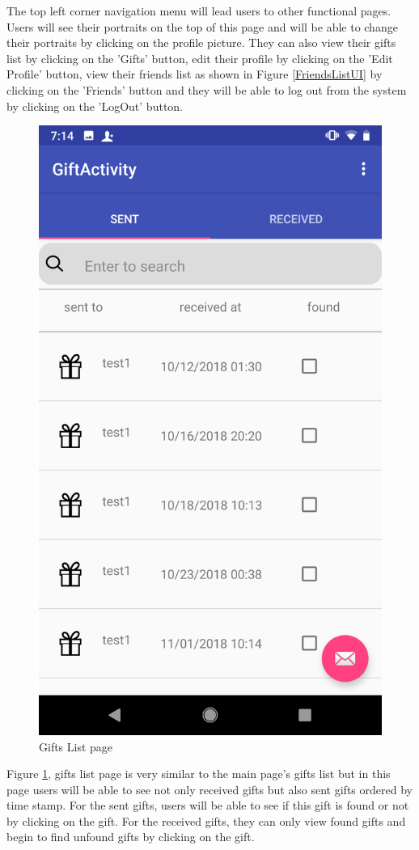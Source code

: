 \par The top left corner navigation menu will lead users to other functional pages. Users will see their portraits on the top of this page and will be able to change their portraits by clicking on the profile picture. They can also view their gifts list by clicking on the 'Gifts' button, edit their profile by clicking on the 'Edit Profile' button, view their friends list as shown in Figure \ref{FriendsListUI} by clicking on the 'Friends' button and they will be able to log out from the system by clicking on the 'LogOut' button. 

\begin{figure}[htb]
\centering
\includegraphics[width=.5\textwidth]{section03/assets/GiftsList.png}
\caption[Short Caption 2]{\label{GiftsListUI}Gifts List page}
\end{figure}
\par Figure \ref{GiftsListUI}, gifts list page is very similar to the main page's gifts list but in this page users will be able to see not only received gifts but also sent gifts ordered by time stamp. For the sent gifts, users will be able to see if this gift is found or not by clicking on the gift. For the received gifts, they can only view found gifts and begin to find unfound gifts by clicking on the gift. 


